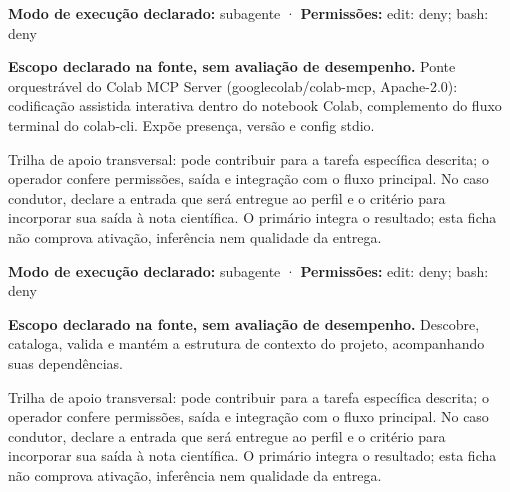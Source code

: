 \begin{arquitetura}
\textbf{Modo de execução declarado:} subagente · \textbf{Permissões:} edit: deny; bash: deny
\end{arquitetura}


\begin{descricao}
\textbf{Escopo declarado na fonte, sem avaliação de desempenho.}
Ponte orquestrável do Colab MCP Server (googlecolab/colab-mcp, Apache-2.0): codificação assistida interativa dentro do notebook Colab, complemento do fluxo terminal do colab-cli. Expõe presença, versão e config stdio.
\end{descricao}

\begin{funcao}
Trilha de apoio transversal: pode contribuir para a tarefa específica descrita; o operador confere permissões, saída e integração com o fluxo principal. No caso condutor, declare a entrada que será entregue ao perfil e o critério para incorporar sua saída à nota científica. O primário integra o resultado; esta ficha não comprova ativação, inferência nem qualidade da entrega.
\end{funcao}

\begin{arquitetura}
\textbf{Modo de execução declarado:} subagente · \textbf{Permissões:} edit: deny; bash: deny
\end{arquitetura}


\begin{descricao}
\textbf{Escopo declarado na fonte, sem avaliação de desempenho.}
Descobre, cataloga, valida e mantém a estrutura de contexto do projeto, acompanhando suas dependências.
\end{descricao}

\begin{funcao}
Trilha de apoio transversal: pode contribuir para a tarefa específica descrita; o operador confere permissões, saída e integração com o fluxo principal. No caso condutor, declare a entrada que será entregue ao perfil e o critério para incorporar sua saída à nota científica. O primário integra o resultado; esta ficha não comprova ativação, inferência nem qualidade da entrega.
\end{funcao}

